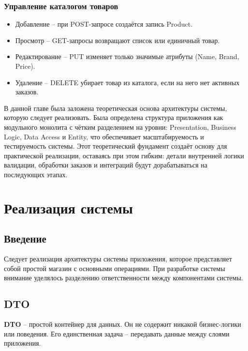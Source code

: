 \documentclass[a4paper,12pt]{report}
\begin{document}
\subsection{Управление каталогом  товаров}

\begin{itemize}
    \item
        Добавление -- при POST-запросе создаётся запись Product.
    \item 
        Просмотр -- GET-запросы возвращают список или единичный товар.
    \item   
        Редактирование -- PUT изменяет только значимые атрибуты (Name, Brand, Price).
    \item
        Удаление -- DELETE убирает товар из каталога, если на него нет активных заказов.
\end{itemize}


В данной главе была заложена теоретическая основа архитектуры системы, которую следует реализовать. 
Была определена структура приложения как модульного монолита с чётким разделением на уровни: 
Presentation, Business Logic, Data Access и Entity, что обеспечивает масштабируемость и тестируемость системы.
Этот теоретический фундамент создаёт основу для практической реализации, оставаясь при этом гибким: 
детали внутренней логики валидации, обработки заказов и интеграций будут дорабатываться на последующих этапах.

\chapter{Реализация системы}\label{implementation_chapter_title}

\section{Введение}

Следует реализация архитектуры системы приложения, которое представляет собой простой магазин с основными операциями. 
При разработке системы внимание уделялось разделению ответственности между компонентами системы.

\section{\acs{DTO}}

\textbf{\acs{DTO}} -- простой контейнер для данных. Он не содержит никакой бизнес-логики или поведения.
Его единственная задача -- передавать данные между слоями приложения.
\end{document}
